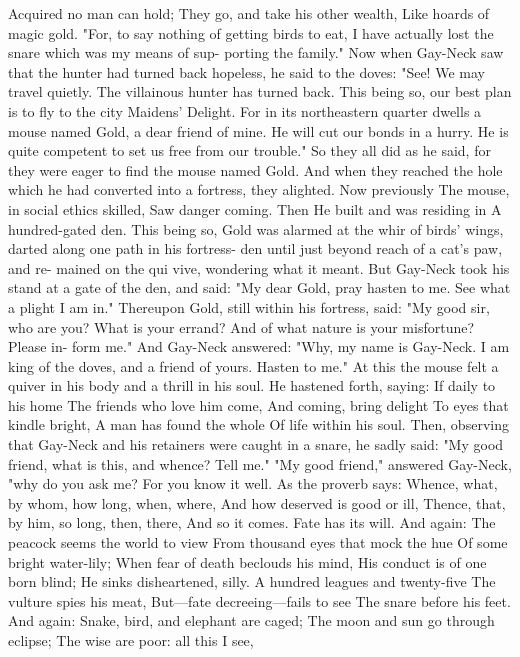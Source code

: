 \documentclass{book}
\begin{document}
Acquired no man can hold;
They go, and take his other wealth,
Like hoards of magic gold.
"For, to say nothing of getting birds to eat, I have
actually lost the snare which was my means of sup-
porting the family."
Now when Gay-Neck saw that the hunter had
turned back hopeless, he said to the doves: "See!
We may travel quietly. The villainous hunter has
turned back. This being so, our best plan is to fly to
the city Maidens' Delight. For in its northeastern
quarter dwells a mouse named Gold, a dear friend of
mine. He will cut our bonds in a hurry. He is quite
competent to set us free from our trouble."
So they all did as he said, for they were eager to
find the mouse named Gold. And when they reached
the hole which he had converted into a fortress, they
alighted. Now previously
The mouse, in social ethics skilled,
Saw danger coming. Then
He built and was residing in
A hundred-gated den.
This being so, Gold was alarmed at the whir of
birds' wings, darted along one path in his fortress-
den until just beyond reach of a cat's paw, and re-
mained on the qui vive, wondering what it meant. But
Gay-Neck took his stand at a gate of the den, and
said: "My dear Gold, pray hasten to me. See what a
plight I am in."
Thereupon Gold, still within his fortress, said:
"My good sir, who are you? What is your errand?
And of what nature is your misfortune? Please in-
form me." And Gay-Neck answered: "Why, my
name is Gay-Neck. I am king of the doves, and a
friend of yours. Hasten to me." At this the mouse
felt a quiver in his body and a thrill in his soul. He
hastened forth, saying:
If daily to his home
The friends who love him come,
And coming, bring delight
To eyes that kindle bright,
A man has found the whole
Of life within his soul.
Then, observing that Gay-Neck and his retainers
were caught in a snare, he sadly said: "My good
friend, what is this, and whence? Tell me."
"My good friend," answered Gay-Neck, "why do
you ask me? For you know it well. As the proverb
says:
Whence, what, by whom, how long, when, where,
And how deserved is good or ill,
Thence, that, by him, so long, then, there,
And so it comes. Fate has its will.
And again:
The peacock seems the world to view
From thousand eyes that mock the hue
Of some bright water-lily;
When fear of death beclouds his mind,
His conduct is of one born blind;
He sinks disheartened, silly.
A hundred leagues and twenty-five
The vulture spies his meat,
But---fate decreeing---fails to see
The snare before his feet.
And again:
Snake, bird, and elephant are caged;
The moon and sun go through eclipse;
The wise are poor: all this I see,
\end{document}
